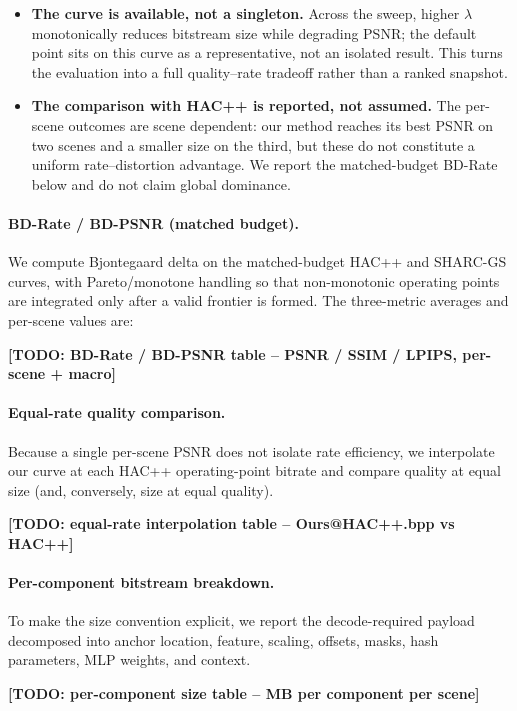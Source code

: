 \documentclass[conference]{IEEEtran}
\begin{document}
\begin{itemize}
    \item \textbf{The curve is available, not a singleton.} Across the
    sweep, higher $\lambda$ monotonically reduces bitstream size while
    degrading PSNR; the default point sits on this curve as a
    representative, not an isolated result. This turns the evaluation
    into a full quality--rate tradeoff rather than a ranked snapshot.
    \item \textbf{The comparison with HAC++ is reported, not assumed.}
    The per-scene outcomes are scene dependent: our method reaches its
    best PSNR on two scenes and a smaller size on the third, but these
    do not constitute a uniform rate--distortion advantage. We report
    the matched-budget BD-Rate below and do not claim global dominance.
\end{itemize}

\paragraph{BD-Rate / BD-PSNR (matched budget).}
We compute Bjontegaard delta on the matched-budget HAC++ and SHARC-GS
curves, with Pareto/monotone handling so that non-monotonic operating
points are integrated only after a valid frontier is formed. The
three-metric averages and per-scene values are:
\begin{center}\textbf{[TODO: BD-Rate / BD-PSNR table -- PSNR / SSIM / LPIPS, per-scene + macro]}
\end{center}

\paragraph{Equal-rate quality comparison.}
Because a single per-scene PSNR does not isolate rate efficiency, we
interpolate our curve at each HAC++ operating-point bitrate and compare
quality at equal size (and, conversely, size at equal quality).
\begin{center}\textbf{[TODO: equal-rate interpolation table -- Ours@HAC++.bpp vs HAC++]}
\end{center}

\paragraph{Per-component bitstream breakdown.}
To make the size convention explicit, we report the decode-required
payload decomposed into anchor location, feature, scaling, offsets,
masks, hash parameters, MLP weights, and context.
\begin{center}\textbf{[TODO: per-component size table -- MB per component per scene]}
\end{center}
\end{document}
